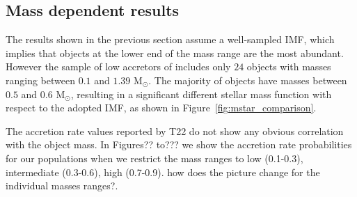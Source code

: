 \documentclass[fleqn,usenatbib,letters]{mnras}
\begin{document}




\subsection{Mass dependent results}

The results shown in the previous section assume a well-sampled IMF, which implies that objects at the lower end of the mass range are the most abundant. However the sample of low accretors of \citet{Thanathibodee2023} includes only $24$ objects with masses ranging between $0.1$ and $1.39$ M$_\odot$. The majority of objects have masses between $0.5$ and $0.6$ M$_\odot$, resulting in a significant different stellar mass function with respect to the adopted IMF, as shown in Figure~\ref{fig:mstar_comparison}.

The accretion rate values reported by T22 do not show any obvious correlation with the object mass. 
In Figures?? to??? we show the accretion rate probabilities for our populations when we restrict the mass ranges to low (0.1-0.3), intermediate (0.3-0.6), high (0.7-0.9). 
{\color{red} how does the picture change for the individual masses ranges?}.
\end{document}

